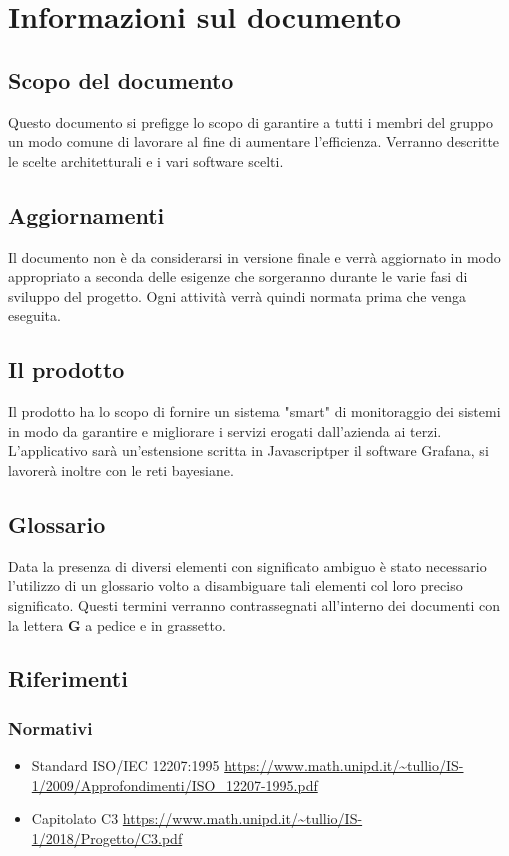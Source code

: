 \section{Informazioni sul documento}
    \subsection{Scopo del documento}
    	Questo documento si prefigge lo scopo di garantire a tutti i membri del gruppo un modo comune di lavorare al fine di aumentare l'efficienza\pedice. Verranno descritte le scelte architetturali e i vari software scelti. 
    \subsection{Aggiornamenti}
        Il documento non è da considerarsi in versione finale e verrà aggiornato in modo appropriato a seconda delle esigenze che sorgeranno durante le varie fasi di sviluppo del progetto. Ogni attività verrà quindi normata prima che venga eseguita.
    \subsection{Il prodotto}
    	Il prodotto ha lo scopo di fornire un sistema "smart" di monitoraggio dei sistemi in modo da garantire e migliorare i servizi erogati dall'azienda ai terzi. L'applicativo sarà un'estensione scritta in Javascript\pedice per il software Grafana\pedice, si lavorerà inoltre con le reti bayesiane\pedice.
    \subsection{Glossario}
    	Data la presenza di diversi elementi con significato ambiguo è stato necessario l'utilizzo di un glossario volto a disambiguare tali elementi col loro preciso significato. Questi termini verranno contrassegnati all'interno dei documenti con la lettera \textbf{G} a pedice e in grassetto.
\subsection{Riferimenti}
    \subsubsection{Normativi}
	    \begin{itemize}
	        \item Standard ISO/IEC 12207:1995 \newline \url{https://www.math.unipd.it/~tullio/IS-1/2009/Approfondimenti/ISO_12207-1995.pdf}
	        \item Capitolato C3 \newline \url{https://www.math.unipd.it/~tullio/IS-1/2018/Progetto/C3.pdf}
	    \end{itemize}
